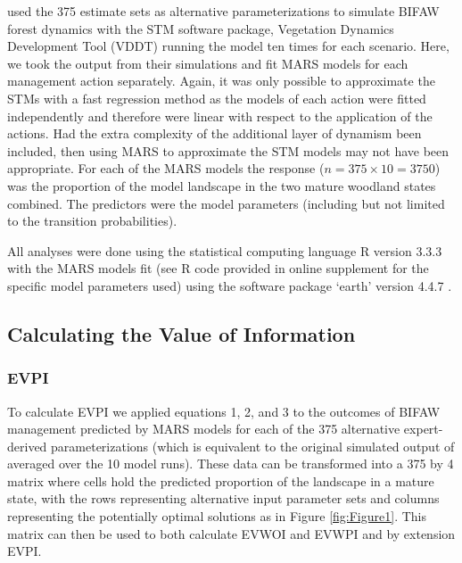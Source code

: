 \documentclass[draft]{article}
\theoremstyle{definition}
\theoremstyle{definition}
\theoremstyle{definition}
\theoremstyle{remark}
\begin{document}
\citet{Czembor2011} used the 375 estimate sets as alternative
parameterizations to simulate BIFAW forest dynamics with the STM
software package, Vegetation Dynamics Development Tool (VDDT)
\citep{ESSA2007} running the model ten times for each scenario. Here, we
took the output from their simulations and fit MARS models for each
management action separately. Again, it was only possible to approximate
the STMs with a fast regression method as the models of each action were
fitted independently and therefore were linear with respect to the
application of the actions. Had the extra complexity of the additional
layer of dynamism been included, then using MARS to approximate the STM
models may not have been appropriate. For each of the MARS models the
response (\(n=375\times10=3750\)) was the proportion of the model
landscape in the two mature woodland states combined. The predictors
were the model parameters (including but not limited to the transition
probabilities).

All analyses were done using the statistical computing language R
version 3.3.3 \citep{R2017} with the MARS models fit (see R code
provided in online supplement for the specific model parameters used)
using the software package `earth' version 4.4.7 \citep{Milborrow2013}.

\subsection*{Calculating the Value of
Information}\label{calculating-the-value-of-information-1}

\subsubsection*{EVPI}\label{evpi}

To calculate EVPI we applied equations 1, 2, and 3 to the outcomes of
BIFAW management predicted by MARS models for each of the 375
alternative expert-derived parameterizations (which is equivalent to the
original simulated output of \citet{Czembor2011} averaged over the 10
model runs). These data can be transformed into a 375 by 4 matrix where
cells hold the predicted proportion of the landscape in a mature state,
with the rows representing alternative input parameter sets and columns
representing the potentially optimal solutions as in Figure
\ref{fig:Figure1}. This matrix can then be used to both calculate EVWOI
and EVWPI and by extension EVPI.
\end{document}
